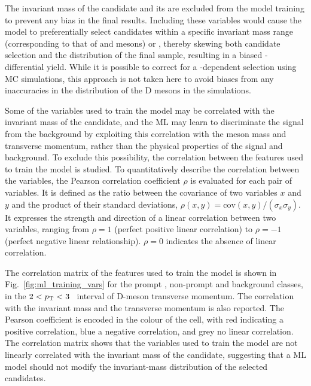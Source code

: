 The invariant mass of the candidate and its \pt are excluded from the model training to prevent any bias in the final results. Including these variables would cause the model to preferentially select candidates within a specific invariant mass range (corresponding to that of \ds and \dpl mesons) or \pt, thereby skewing both candidate selection and the \pt distribution of the final sample, resulting in a biased \pt-differential yield. While it is possible to correct for a \pt-dependent selection using MC simulations, this approach is not taken here to avoid biases from any inaccuracies in the \pt distribution of the D mesons in the simulations. 

Some of the variables used to train the model may be correlated with the invariant mass of the candidate, and the ML may learn to discriminate the signal from the background by exploiting this correlation with the \ds meson mass and transverse momentum, rather than the physical properties of the signal and background. To exclude this possibility, the correlation between the features used to train the model is studied. To quantitatively describe the correlation between the variables, the Pearson correlation coefficient $\rho$ is evaluated for each pair of variables. It is defined as the ratio between the covariance of two variables $x$ and $y$ and the product of their standard deviations, $\rho(x,y) = \mathrm{cov}(x,y)/(\sigma_{x}\sigma_{y})$. It expresses the strength and direction of a linear correlation between two variables, ranging from $\rho = 1$ (perfect positive linear correlation) to $\rho = -1$ (perfect negative linear relationship). $\rho = 0$ indicates the absence of linear correlation.


\begin{sloppypar}
The correlation matrix of the features used to train the model is shown in Fig.~\ref{fig:ml_training_vars} for the prompt \ds, non-prompt \ds and background classes, in the \mbox{$2<p_\mathrm{T}<3$~\gevc} interval of D-meson transverse momentum. The correlation with the invariant mass and the transverse momentum is also reported. The Pearson coefficient is encoded in the colour of the cell, with red indicating a positive correlation, blue a negative correlation, and grey no linear correlation. The correlation matrix shows that the variables used to train the model are not linearly correlated with the invariant mass of the candidate, suggesting that a ML model should not modify the invariant-mass distribution of the selected candidates.
\end{sloppypar}

